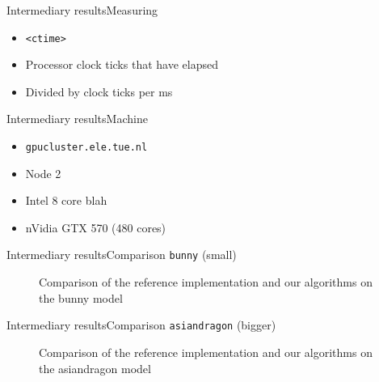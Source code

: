 \begin{frame}{Intermediary results}{Measuring}
	\begin{itemize}
		\item \texttt{<ctime>}
		\item Processor clock ticks that have elapsed
		\item Divided by clock ticks per ms
	\end{itemize}
\end{frame}

\begin{frame}{Intermediary results}{Machine}
	\begin{itemize}
		\item \texttt{gpucluster.ele.tue.nl}
		\item Node 2
		\item Intel 8 core blah
		\item nVidia GTX 570 (480 cores)
	\end{itemize}
\end{frame}


\begin{frame}{Intermediary results}{Comparison \texttt{bunny} (small)}
	\begin{figure}
		\center
		\resizebox{!}{.5\paperheight}{}
		\label{fig:res:bunny}
		\caption{Comparison of the reference implementation and our algorithms on the bunny model}
	\end{figure}
\end{frame}

\begin{frame}{Intermediary results}{Comparison \texttt{asiandragon} (bigger)}
	\begin{figure}
		\center
		\resizebox{!}{.5\paperheight}{}
		\label{fig:res:asian}
		\caption{Comparison of the reference implementation and our algorithms on the asiandragon model}
	\end{figure}
\end{frame}

